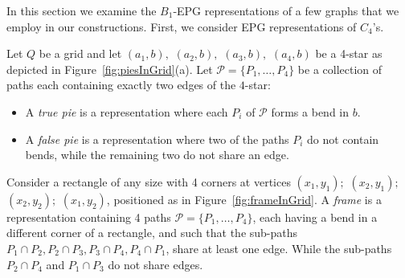 \documentclass[runningheads]{llncs}
\begin{document}
% 

In this section we examine the $B_1$-EPG representations of a few graphs that we employ in our constructions. First, we consider EPG representations of $C_4$'s.


\begin{definition} \label{defi:tortasFrame}

Let $ Q $ be a grid and let $ (a_1, b),$ $(a_2, b),$ $(a_3, b),$ $(a_4, b)$ be a 4-star as depicted in Figure~\ref{fig:piesInGrid}(a). Let $ \mathcal{P} = \{P_1, \dots , P_4\}$ be a collection of paths each containing exactly two edges of the $4$-star:

\begin{itemize}
\item A \emph{true pie} is a representation where each $P_i$ of $ \mathcal{P} $ forms a bend in $b$.

\item A \emph {false pie} is a representation where two of the paths $P_i$ do not contain bends, while the remaining two do not share an edge. 

\vspace{-0.5cm}

\vspace{-0.5cm}
\end{itemize}
\end{definition}

\begin{definition} \label{defi:tortasFrame2}
 Consider a rectangle of any size with 4 corners at vertices $ (x_1, y_1);$ $(x_2, y_1);$ $(x_2, y_2);$ $(x_1, y_2) $, positioned as in  Figure~\ref{fig:frameInGrid}. A \emph{frame} is a representation containing 4 paths $\mathcal{P} =  \{ P_1, \dots, P_4\} $, each having a bend in a different corner of a rectangle, and such that the  sub-paths $ P_1 \cap P_2, P_2 \cap P_3, P_3 \cap P_4, P_4 \cap P_1 $, share at least one edge. While the sub-paths $ P_2 \cap P_4 $ and $ P_1 \cap P_3 $ do not share edges.



\end{definition}
\end{document}
